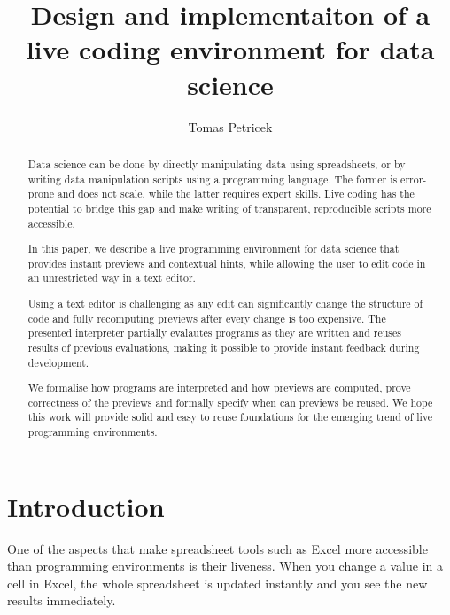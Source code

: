 \documentclass[sigplan,10pt]{acmart}\settopmatter{printfolios=true,printccs=false,printacmref=false}
\title{Design and implementaiton of a live coding environment for data science}
\author{Tomas Petricek}
\affiliation{
  \institution{The Alan Turing Institute}
  \country{London, United Kingdom}
}
\theoremstyle{plain}
\theoremstyle{definition}
\begin{document}
\begin{abstract}
Data science can be done by directly manipulating data using spreadsheets, or by writing 
data manipulation scripts using a programming language. The former is error-prone and
does not scale, while the latter requires expert skills. Live coding has the potential to 
bridge this gap and make writing of transparent, reproducible scripts more accessible.

In this paper, we describe a live programming environment for data science that provides instant 
previews and contextual hints, while allowing the user to edit code in an unrestricted way in
a text editor. 

Using a text editor is challenging as any edit can significantly change the structure of code and
fully recomputing previews after every change is too expensive. The presented interpreter partially 
evalautes programs as they are written and reuses results of previous evaluations, making it 
possible to provide instant feedback during development.

We formalise how programs are interpreted and how previews are computed, prove correctness
of the previews and formally specify when can previews be reused. We hope this work will provide
solid and easy to reuse foundations for the emerging trend of live programming environments.
\end{abstract}
\maketitle


\section{Introduction}
One of the aspects that make spreadsheet tools such as Excel more accessible than programming 
environments is their liveness. When you change a value in a cell in Excel, the whole spreadsheet
is updated instantly and you see the new results immediately.
\end{document}
